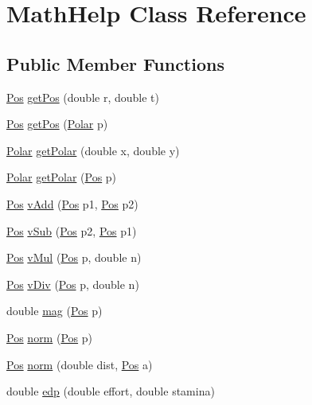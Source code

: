 \hypertarget{classMathHelp}{
\section{MathHelp Class Reference}
\label{classMathHelp}
}
\subsection*{Public Member Functions}
\begin{DoxyCompactItemize}
\item 
\hyperlink{classPos}{Pos} \hyperlink{classMathHelp_a8910f58864c8ad7c964f1b9e6241c3a9}{getPos} (double r, double t)
\item 
\hyperlink{classPos}{Pos} \hyperlink{classMathHelp_a975b04bfd9e506dcb62c658cfdda910f}{getPos} (\hyperlink{classPolar}{Polar} p)
\item 
\hyperlink{classPolar}{Polar} \hyperlink{classMathHelp_af5becf9a49a27ab7d3c11205c69a6644}{getPolar} (double x, double y)
\item 
\hyperlink{classPolar}{Polar} \hyperlink{classMathHelp_ae90724ff785c0e729c48073bfe276dc6}{getPolar} (\hyperlink{classPos}{Pos} p)
\item 
\hyperlink{classPos}{Pos} \hyperlink{classMathHelp_aac941d01d5b7a39092120473e22075bc}{vAdd} (\hyperlink{classPos}{Pos} p1, \hyperlink{classPos}{Pos} p2)
\item 
\hyperlink{classPos}{Pos} \hyperlink{classMathHelp_a681a7f391da9730a01307dc1ac853f81}{vSub} (\hyperlink{classPos}{Pos} p2, \hyperlink{classPos}{Pos} p1)
\item 
\hyperlink{classPos}{Pos} \hyperlink{classMathHelp_aeedf926ba8b78f6731d9a4b6f89d97f3}{vMul} (\hyperlink{classPos}{Pos} p, double n)
\item 
\hyperlink{classPos}{Pos} \hyperlink{classMathHelp_ac00a3269d2dbea54cadfe040d3b2e7da}{vDiv} (\hyperlink{classPos}{Pos} p, double n)
\item 
double \hyperlink{classMathHelp_abb0870985eba7de0cfe486a3066499ce}{mag} (\hyperlink{classPos}{Pos} p)
\item 
\hyperlink{classPos}{Pos} \hyperlink{classMathHelp_ae961633e0f2fafcaf2a3baa43bb6037f}{norm} (\hyperlink{classPos}{Pos} p)
\item 
\hyperlink{classPos}{Pos} \hyperlink{classMathHelp_ac002b3f94b3fcf1151f2ac811c15b650}{norm} (double dist, \hyperlink{classPos}{Pos} a)
\item 
double \hyperlink{classMathHelp_a930ea3f6ff9ea0028675b9b7d5750601}{edp} (double effort, double stamina)

\end{DoxyCompactItemize}
